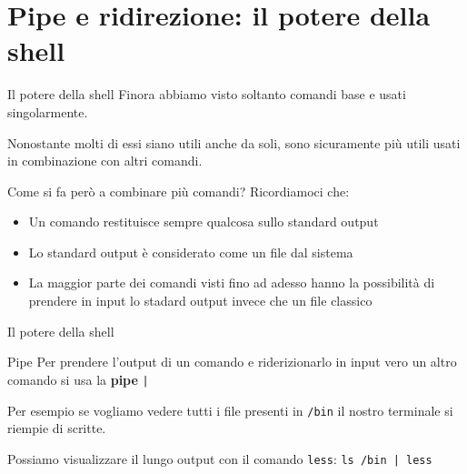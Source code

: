 \documentclass{beamer}
\begin{document}
\section{Pipe e ridirezione: il potere della shell}
\begin{frame}{Il potere della shell}
  Finora abbiamo visto soltanto comandi base e usati singolarmente.\bigskip

  Nonostante molti di essi siano utili anche da soli, sono sicuramente più 
  utili usati in combinazione con altri comandi.\bigskip

  Come si fa però a combinare più comandi? \pause
  Ricordiamoci che:
  \begin{itemize}
    \item <2-> Un comando restituisce sempre qualcosa sullo standard output
    \item <3-> Lo standard output è considerato come un file dal sistema
    \item <4-> La maggior parte dei comandi visti fino ad adesso hanno la 
      possibilità di prendere in input lo stadard output invece che un file 
      classico
  \end{itemize}
\end{frame}

\begin{frame}{Il potere della shell}
  \begin{figure}
  \end{figure}
\end{frame}

\begin{frame}{Pipe}
  Per prendere l'output di un comando e riderizionarlo in input vero un altro
  comando si usa la \textbf{pipe} \texttt{|}\bigskip

  Per esempio se vogliamo vedere tutti i file presenti in \texttt{/bin} il 
  nostro terminale si riempie di scritte.\bigskip

  Possiamo visualizzare il lungo output con il comando \texttt{less}: 
  \texttt{ls /bin | less}
\end{frame}
\end{document}
